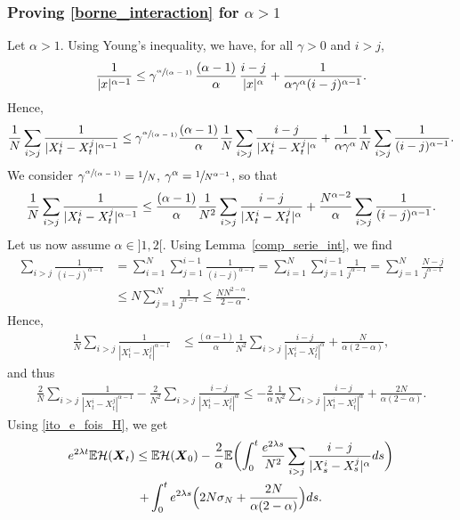 \documentclass[10pt]{amsart}
\newcommand{\spfrac}[2]{\sfrac{#1}{(#2)}}
\newcommand{\bX}{{\boldsymbol{X}}}
\theoremstyle{plain}
\theoremstyle{definition}
\begin{document}
\subsubsection*{Proving \eqref{borne_interaction} for $\alpha>1$} Let $\alpha>1$. Using Young's inequality, we have, for all $\gamma>0$ and $i>j$,
\begin{align*}
\frac{1}{|x|^{\alpha-1}}\leq\gamma^{\spfrac{\alpha}{\alpha-1}}\,\frac{(\alpha-1)}{\alpha}\,\frac{i-j}{|x|^{\alpha}}+\frac{1}{\alpha\gamma^\alpha(i-j)^{\alpha-1}}.
\end{align*}
Hence,
\begin{align*}
\frac{1}{N}\sum_{i>j}\frac{1}{|X^i_t-X^j_t|^{\alpha-1}}\leq \gamma^{\spfrac{\alpha}{\alpha-1}}\frac{(\alpha-1)}{\alpha}\frac{1}{N}\sum_{i>j}\frac{i-j}{|X^i_t-X^j_t|^{\alpha}}+\frac{1}{\alpha\gamma^\alpha}\frac{1}{N}\sum_{i>j}\frac{1}{(i-j)^{\alpha-1}}.
\end{align*}
We consider $\gamma^{\spfrac{\alpha}{\alpha-1}}=\sfrac{1}{N}$, \ie $\gamma^{\alpha}=\sfrac{1}{N^{\alpha-1}}$, so that
\begin{equation}\label{controle_serie}
\frac{1}{N}\sum_{i>j}\frac{1}{|X^i_t-X^j_t|^{\alpha-1}}\leq\frac{(\alpha-1)}{\alpha}\frac{1}{N^2}\sum_{i>j}\frac{i-j}{|X^i_t-X^j_t|^{\alpha}}+\frac{N^{\alpha-2}}{\alpha}\sum_{i>j}\frac{1}{(i-j)^{\alpha-1}}.\\
\end{equation}
Let us now assume $\alpha\in{}]1,2[$. Using Lemma~\ref{comp_serie_int}, we find
\begin{align*}
\sum_{i>j}\frac{1}{(i-j)^{\alpha-1}}&=\sum_{i=1}^N\sum_{j=1}^{i-1}\frac{1}{(i-j)^{\alpha-1}}=\sum_{i=1}^N\sum_{j=1}^{i-1}\frac{1}{j^{\alpha-1}}=\sum_{j=1}^N\frac{N-j}{j^{\alpha-1}}\\
&\leq N\sum_{j=1}^N\frac{1}{j^{\alpha-1}}\leq \frac{NN^{2-\alpha}}{2-\alpha}.
\end{align*}
Hence,
\begin{align*}
\frac{1}{N}\sum_{i>j}\frac{1}{|X^i_t-X^j_t|^{\alpha-1}}&\leq \frac{(\alpha-1)}{\alpha}\frac{1}{N^2}\sum_{i>j}\frac{i-j}{|X^i_t-X^j_t|^{\alpha}}+\frac{N}{\alpha(2-\alpha)},
\end{align*}
and thus
\begin{align*}
\frac{2}{N}\sum_{i>j}\frac{1}{|X^i_t-X^j_t|^{\alpha-1}}-\frac{2}{N^2}\sum_{i>j}\frac{i-j}{|X^i_t-X^j_t|^{\alpha}}\leq -\frac{2}{\alpha}\frac{1}{N^2}\sum_{i>j}\frac{i-j}{|X^i_t-X^j_t|^{\alpha}}+\frac{2N}{\alpha(2-\alpha)}.
\end{align*}
Using \eqref{ito_e_fois_H}, we get
\begin{multline}\label{gronwall_H}
e^{2\lambda t}\mathbb{E}\mathcal{H}(\bX_t)\leq \mathbb{E}\mathcal{H}(\bX_0)-\frac{2}{\alpha}\mathbb{E}\biggl(\int_0^t\frac{e^{2\lambda s}}{N^2}\sum_{i>j}\frac{i-j}{|X^i_s-X^j_s|^{\alpha}}ds\biggr)\\
+\int_0^te^{2\lambda s}\Bigl(2N\sigma_N+\frac{2N}{\alpha(2-\alpha)}\Bigr)ds.
\end{multline}
\end{document}
